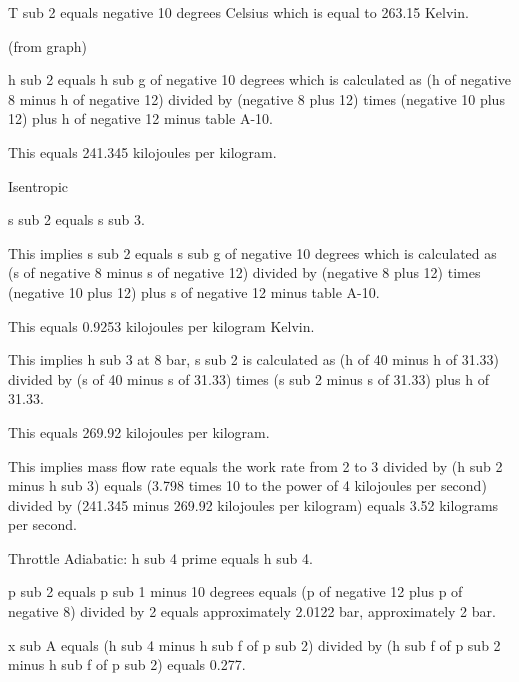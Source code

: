 T sub 2 equals negative 10 degrees Celsius which is equal to 263.15 Kelvin.

(from graph)

h sub 2 equals h sub g of negative 10 degrees which is calculated as (h of negative 8 minus h of negative 12) divided by (negative 8 plus 12) times (negative 10 plus 12) plus h of negative 12 minus table A-10.

This equals 241.345 kilojoules per kilogram.

Isentropic

s sub 2 equals s sub 3.

This implies s sub 2 equals s sub g of negative 10 degrees which is calculated as (s of negative 8 minus s of negative 12) divided by (negative 8 plus 12) times (negative 10 plus 12) plus s of negative 12 minus table A-10.

This equals 0.9253 kilojoules per kilogram Kelvin.

This implies h sub 3 at 8 bar, s sub 2 is calculated as (h of 40 minus h of 31.33) divided by (s of 40 minus s of 31.33) times (s sub 2 minus s of 31.33) plus h of 31.33.

This equals 269.92 kilojoules per kilogram.

This implies mass flow rate equals the work rate from 2 to 3 divided by (h sub 2 minus h sub 3) equals (3.798 times 10 to the power of 4 kilojoules per second) divided by (241.345 minus 269.92 kilojoules per kilogram) equals 3.52 kilograms per second.

Throttle Adiabatic: h sub 4 prime equals h sub 4.

p sub 2 equals p sub 1 minus 10 degrees equals (p of negative 12 plus p of negative 8) divided by 2 equals approximately 2.0122 bar, approximately 2 bar.

x sub A equals (h sub 4 minus h sub f of p sub 2) divided by (h sub f of p sub 2 minus h sub f of p sub 2) equals 0.277.